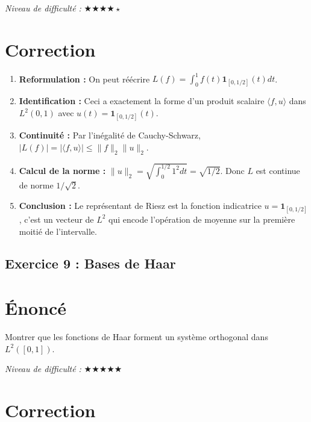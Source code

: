 \documentclass[11pt,a4paper]{article}
\begin{document}
\textit{Niveau de difficulté :} $\bigstar\bigstar\bigstar\bigstar\star$

\section{Correction}

\begin{enumerate}
\item \textbf{Reformulation :} On peut réécrire $L(f) = \int_0^1 f(t) \mathbf{1}_{[0, 1/2]}(t) dt$.
\item \textbf{Identification :} Ceci a exactement la forme d'un produit scalaire $\langle f, u \rangle$ dans $L^2(0, 1)$ avec $u(t) = \mathbf{1}_{[0, 1/2]}(t)$.
\item \textbf{Continuité :} Par l'inégalité de Cauchy-Schwarz, $|L(f)| = |\langle f, u \rangle| \le \|f\|_2 \|u\|_2$.
\item \textbf{Calcul de la norme :} $\|u\|_2 = \sqrt{\int_0^{1/2} 1^2 dt} = \sqrt{1/2}$. Donc $L$ est continue de norme $1/\sqrt{2}$.
\item \textbf{Conclusion :} Le représentant de Riesz est la fonction indicatrice $u = \mathbf{1}_{[0, 1/2]}$, c'est un vecteur de $L^2$ qui encode l'opération de moyenne sur la première moitié de l'intervalle.
\end{enumerate}


\subsection*{Exercice 9 : Bases de Haar}

\section{Énoncé}

Montrer que les fonctions de Haar forment un système orthogonal dans $L^2([0, 1])$.

\textit{Niveau de difficulté :} $\bigstar\bigstar\bigstar\bigstar\bigstar$

\section{Correction}
\end{document}
